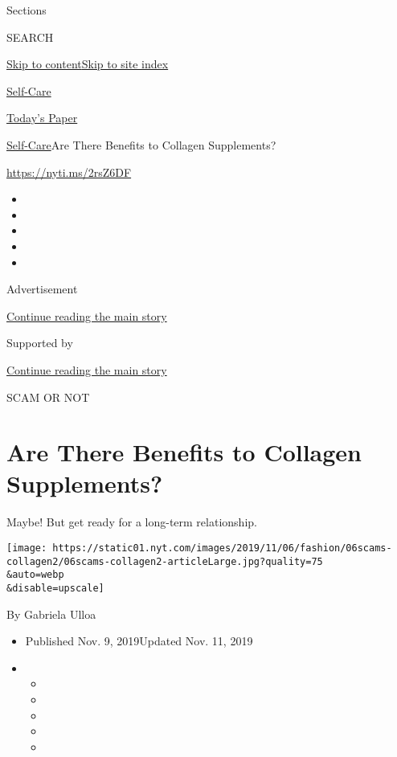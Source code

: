 Sections

SEARCH

\protect\hyperlink{site-content}{Skip to
content}\protect\hyperlink{site-index}{Skip to site index}

\href{https://www.nytimes.com/section/style/self-care/}{Self-Care}

\href{https://myaccount.nytimes.com/auth/login?response_type=cookie\&client_id=vi}{}

\href{https://www.nytimes.com/section/todayspaper}{Today's Paper}

\href{/section/style/self-care/}{Self-Care}\textbar{}Are There Benefits
to Collagen Supplements?

\url{https://nyti.ms/2rsZ6DF}

\begin{itemize}
\item
\item
\item
\item
\item
\end{itemize}

Advertisement

\protect\hyperlink{after-top}{Continue reading the main story}

Supported by

\protect\hyperlink{after-sponsor}{Continue reading the main story}

SCAM OR NOT

\hypertarget{are-there-benefits-to-collagen-supplements}{%
\section{Are There Benefits to Collagen
Supplements?}\label{are-there-benefits-to-collagen-supplements}}

Maybe! But get ready for a long-term relationship.

\texttt{[image: https://static01.nyt.com/images/2019/11/06/fashion/06scams-collagen2/06scams-collagen2-articleLarge.jpg?quality=75\\\&auto=webp\\\&disable=upscale]}

By Gabriela Ulloa

\begin{itemize}
\item
  Published Nov. 9, 2019Updated Nov. 11, 2019
\item
  \begin{itemize}
  \item
  \item
  \item
  \item
  \item
  \end{itemize}
\end{itemize}

